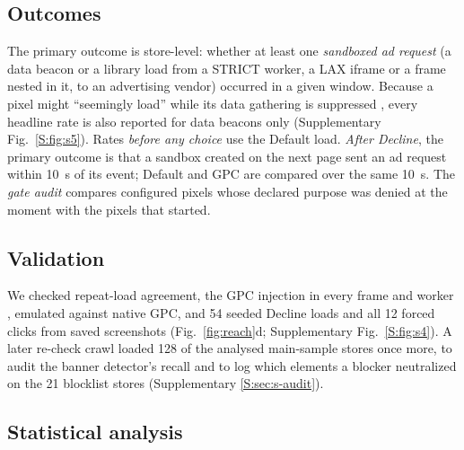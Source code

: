 \subsection{Outcomes}\label{sec:method-outcomes}

The primary outcome is store-level: whether at least one \emph{sandboxed ad request} (a data beacon or a library load from a STRICT worker, a LAX iframe or a frame nested in it, to an advertising vendor) occurred in a given window. Because a pixel might ``seemingly load'' while its data gathering is suppressed \citep{truevault_apppixel}, every headline rate is also reported for data beacons only (Supplementary Fig.~\ref*{S:fig:s5}). Rates \emph{before any choice} use the Default load. \emph{After Decline}, the primary outcome is that a sandbox created on the next page sent an ad request within 10~s of its  event; Default and GPC are compared over the same 10~s. The \emph{gate audit} compares configured pixels whose declared purpose was denied at the moment with the pixels that started.

\subsection{Validation}\label{sec:method-validation}

We checked repeat-load agreement, the GPC injection in every frame and worker \citep{krumnow2022openwpm}, emulated against native GPC, and 54 seeded Decline loads and all 12 forced clicks from saved screenshots (Fig.~\ref{fig:reach}d; Supplementary Fig.~\ref*{S:fig:s4}). A later re-check crawl loaded 128 of the analysed main-sample stores once more, to audit the banner detector's recall and to log which elements a blocker neutralized on the 21 blocklist stores (Supplementary \ref*{S:sec:s-audit}).

\subsection{Statistical analysis}\label{sec:method-stats}

